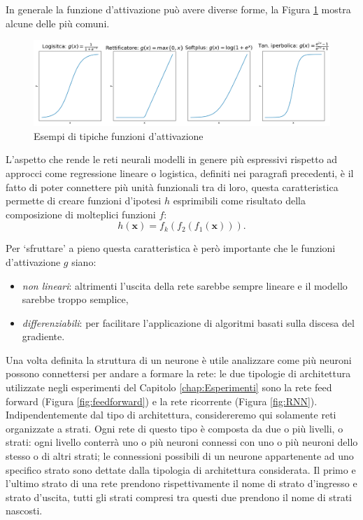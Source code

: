 \documentclass[../../main.tex]{subfiles}
\begin{document}
In generale la funzione d'attivazione può avere diverse forme, la Figura \ref{fig:activations} mostra alcune delle più comuni.

\begin{figure}[H]
    \centering
    \includegraphics[width=\textwidth]{immagini/4_2/activation_func.png}
    \caption{Esempi di tipiche funzioni d'attivazione}
    \label{fig:activations}
\end{figure}

L'aspetto che rende le reti neurali modelli in genere più espressivi rispetto ad approcci come regressione lineare o logistica, definiti nei paragrafi precedenti, è il fatto di poter connettere più unità funzionali tra di loro, questa caratteristica permette di creare funzioni d'ipotesi $h$ esprimibili come risultato della composizione di molteplici funzioni $f$:
\[h(\boldsymbol{x}) = f_k\left(f_2\left(f_1(\boldsymbol{x})\right)\right).\]

Per  `sfruttare' a pieno questa caratteristica è però importante che le funzioni d'attivazione $g$ siano:
\begin{itemize}
    \item \textit{non lineari}: altrimenti l’uscita della rete sarebbe sempre lineare e il modello sarebbe troppo semplice,
    \item \textit{differenziabili}: per facilitare l'applicazione di algoritmi basati sulla discesa del gradiente.
\end{itemize}

Una volta definita la struttura di un neurone è utile analizzare come più neuroni possono connettersi per andare a formare la rete: le due tipologie di architettura utilizzate negli esperimenti del Capitolo \ref{chap:Esperimenti} sono la rete feed forward (Figura \ref{fig:feedforward}) e la rete ricorrente (Figura \ref{fig:RNN}). Indipendentemente dal tipo di architettura, considereremo qui solamente reti organizzate a strati. Ogni rete di questo tipo è composta da due o più livelli, o strati: ogni livello conterrà uno o più neuroni connessi con uno o più neuroni dello stesso o di altri strati; le connessioni possibili di un neurone appartenente ad uno specifico strato sono dettate dalla tipologia di architettura considerata. Il primo e l'ultimo strato di una rete prendono rispettivamente il nome di strato d'ingresso e strato d'uscita, tutti gli strati compresi tra questi due prendono il nome di strati nascosti.
\end{document}
